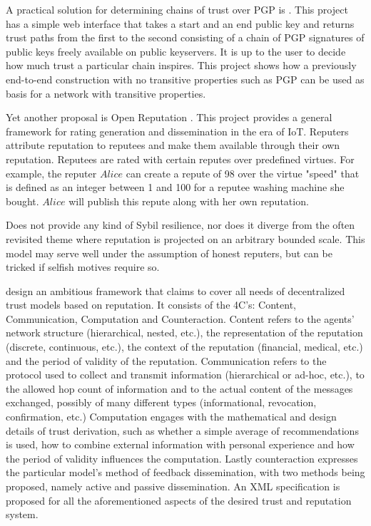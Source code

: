   A practical solution for determining chains of trust over PGP is \cite{pathfinder}. This project has a simple web interface
  that takes a start and an end public key and returns trust paths from the first to the second consisting of a chain of PGP
  signatures of public keys freely available on public keyservers. It is up to the user to decide how much trust a particular
  chain inspires. This project shows how a previously end-to-end construction with no transitive properties such as PGP can
  be used as basis for a network with transitive properties.

  Yet another proposal is Open Reputation \cite{openrep}. This project provides a general framework for rating generation and
  dissemination in the era of IoT. Reputers attribute reputation to reputees and make them available through their own
  reputation. Reputees are rated with certain reputes over predefined virtues. For example, the reputer $Alice$ can create
  a repute of 98 over the virtue "speed" that is defined as an integer between 1 and 100 for a reputee washing machine she
  bought. $Alice$ will publish this repute along with her own reputation.

  \cite{openrep} Does not provide any kind of Sybil resilience, nor does it diverge from the often revisited theme where
  reputation is projected on an arbitrary bounded scale. This model may serve well under the assumption of honest reputers,
  but can be tricked if selfish motives require so.

  \cite{sdt} design an ambitious framework that claims to cover all needs of decentralized trust models based on reputation.
  It consists of the 4C's: Content, Communication, Computation and Counteraction. Content refers to the agents' network
  structure (hierarchical, nested, etc.), the representation of the reputation (discrete, continuous, etc.), the context of
  the reputation (financial, medical, etc.) and the period of validity of the reputation. Communication refers to the
  protocol used to collect and transmit information (hierarchical or ad-hoc, etc.), to the allowed hop count of information
  and to the actual content of the messages exchanged, possibly of many different types (informational, revocation,
  confirmation, etc.) Computation engages with the mathematical and design details of trust derivation, such as whether a
  simple average of recommendations is used, how to combine external information with personal experience and how the period
  of validity influences the computation. Lastly counteraction expresses the particular model's method of feedback
  dissemination, with two methods being proposed, namely active and passive dissemination. An XML specification is proposed
  for all the aforementioned aspects of the desired trust and reputation system.

